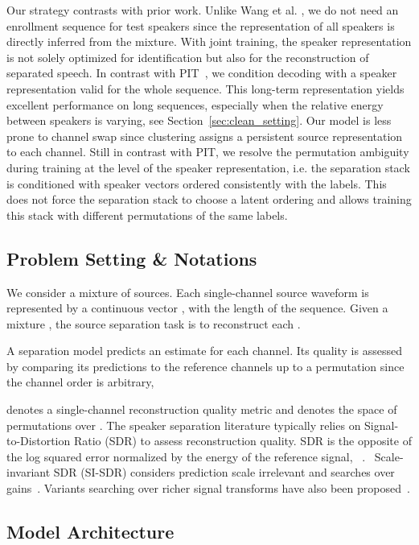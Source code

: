 \documentclass[letterpaper, onecolumn,10 pt]{IEEEtran}
\begin{document}
Our strategy contrasts with prior work. Unlike Wang et al. \cite{wang18:voicefilter}, we do not need an enrollment sequence for test speakers since the representation of all speakers is directly inferred from the mixture. With joint training, the speaker representation is not solely optimized for identification but also for the reconstruction of separated speech. In contrast with PIT~\cite{yu17:pit}, we condition decoding with a speaker representation valid for the whole sequence. This long-term representation yields excellent performance on long sequences, especially when the relative energy between speakers is varying, see Section~\ref{sec:clean_setting}. Our model is less prone to channel swap since clustering assigns a persistent source representation to each channel. Still in contrast with PIT, we resolve the permutation ambiguity during training at the level of the speaker representation, i.e. the separation stack is conditioned with speaker vectors ordered consistently with the labels. This does not force the separation stack to choose a latent ordering and allows training this stack with different permutations of the same labels.

\subsection{Problem Setting \& Notations}
\label{sec:problem_setting}

We consider a mixture of  sources. Each single-channel source waveform  is represented 
by a continuous vector , with  the length of the sequence. Given a mixture \mbox{}, the source separation task is to reconstruct each .

A separation model  predicts an estimate for each channel. Its 
quality is assessed by comparing its predictions to the reference channels 
 up to a permutation since the channel order is arbitrary,

 denotes a single-channel reconstruction quality metric and
 denotes the space of permutations over .
The speaker separation literature typically relies on Signal-to-Distortion Ratio (SDR) to
assess reconstruction quality. SDR is the opposite of the log squared error normalized by the energy of the reference signal,
\mbox{
.
}
Scale-invariant SDR (SI-SDR) considers prediction scale irrelevant and searches over gains~\cite{leroux19:sdr}. Variants searching over richer signal transforms have also been proposed~\cite{vincent06:bss}.

\subsection{Model Architecture}
\label{sec:modelarch}
\end{document}
